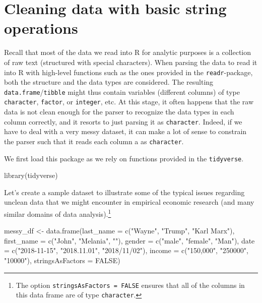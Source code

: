 \documentclass[
  12pt,
]{style/krantz}
\newenvironment{Shaded}{\begin{snugshade}}{\end{snugshade}}
\newcommand{\AttributeTok}[1]{\textcolor[rgb]{0.77,0.63,0.00}{#1}}
\newcommand{\ConstantTok}[1]{\textcolor[rgb]{0.00,0.00,0.00}{#1}}
\newcommand{\FunctionTok}[1]{\textcolor[rgb]{0.00,0.00,0.00}{#1}}
\newcommand{\NormalTok}[1]{#1}
\newcommand{\OtherTok}[1]{\textcolor[rgb]{0.56,0.35,0.01}{#1}}
\newcommand{\StringTok}[1]{\textcolor[rgb]{0.31,0.60,0.02}{#1}}
\begin{document}
\hypertarget{cleaning-data-with-basic-string-operations}{%
\section{Cleaning data with basic string operations}\label{cleaning-data-with-basic-string-operations}}

Recall that most of the data we read into R for analytic purposes is a collection of raw text (structured with special characters). When parsing the data to read it into R with high-level functions such as the ones provided in the \texttt{readr}-package, both the structure and the data types are considered. The resulting \texttt{data.frame}/\texttt{tibble} might thus contain variables (different columns) of type \texttt{character}, \texttt{factor}, or \texttt{integer}, etc. At this stage, it often happens that the raw data is not clean enough for the parser to recognize the data types in each column correctly, and it resorts to just parsing it as \texttt{character}. Indeed, if we have to deal with a very messy dataset, it can make a lot of sense to constrain the parser such that it reads each column a as \texttt{character}.

We first load this package as we rely on functions provided in the \texttt{tidyverse}.

\begin{Shaded}
\begin{Highlighting}[]
\FunctionTok{library}\NormalTok{(tidyverse)}
\end{Highlighting}
\end{Shaded}

Let's create a sample dataset to illustrate some of the typical issues regarding unclean data that we might encounter in empirical economic research (and many similar domains of data analysis).\footnote{The option \texttt{stringsAsFactors\ =\ FALSE} ensures that all of the columns in this data frame are of type \texttt{character}.}

\begin{Shaded}
\begin{Highlighting}[]
\NormalTok{messy\_df }\OtherTok{\textless{}{-}} \FunctionTok{data.frame}\NormalTok{(}\AttributeTok{last\_name =} \FunctionTok{c}\NormalTok{(}\StringTok{"Wayne"}\NormalTok{, }\StringTok{"Trump"}\NormalTok{, }\StringTok{"Karl Marx"}\NormalTok{),}
                       \AttributeTok{first\_name =} \FunctionTok{c}\NormalTok{(}\StringTok{"John"}\NormalTok{, }\StringTok{"Melania"}\NormalTok{, }\StringTok{""}\NormalTok{),}
                       \AttributeTok{gender =} \FunctionTok{c}\NormalTok{(}\StringTok{"male"}\NormalTok{, }\StringTok{"female"}\NormalTok{, }\StringTok{"Man"}\NormalTok{),}
                       \AttributeTok{date =} \FunctionTok{c}\NormalTok{(}\StringTok{"2018{-}11{-}15"}\NormalTok{, }\StringTok{"2018.11.01"}\NormalTok{, }\StringTok{"2018/11/02"}\NormalTok{),}
                       \AttributeTok{income =} \FunctionTok{c}\NormalTok{(}\StringTok{"150,000"}\NormalTok{, }\StringTok{"250000"}\NormalTok{, }\StringTok{"10000"}\NormalTok{),}
                       \AttributeTok{stringsAsFactors =} \ConstantTok{FALSE}\NormalTok{)}
\end{Highlighting}
\end{Shaded}
\end{document}

